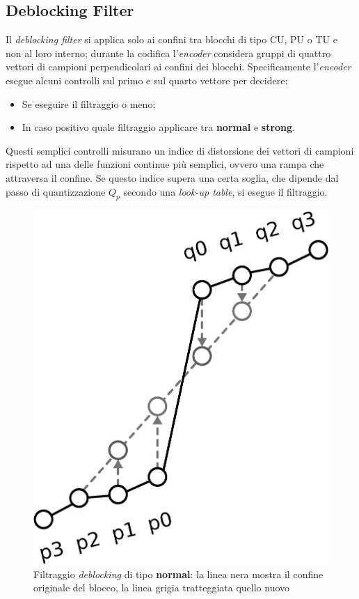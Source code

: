 \subsection{Deblocking Filter}
Il \emph{deblocking filter} si applica solo ai confini tra blocchi di tipo CU, 
PU o TU e non al loro interno; durante la codifica  l'\textit{encoder} 
considera gruppi di quattro vettori di campioni perpendicolari ai confini dei 
blocchi. 
Specificamente l'\textit{encoder} esegue alcuni controlli sul primo e sul 
quarto vettore per decidere:
\begin{itemize}
\item Se eseguire il filtraggio o meno;
\item In caso positivo quale filtraggio applicare tra \textbf{normal} e 
\textbf{strong}.
\end{itemize}
Questi semplici controlli misurano un indice di distorsione dei vettori di 
campioni rispetto ad una delle funzioni continue più semplici, ovvero una rampa 
che attraversa il confine. Se questo indice supera 
una certa soglia, che dipende dal passo di quantizzazione $Q_p$ secondo una 
\emph{look-up table}, si esegue il filtraggio.

\begin{figure}[H]
  \captionsetup{justification=raggedright}
  \centering
  \includegraphics[scale=0.3]{Figures/Deblocking_filter}
    \caption[Filtraggio \emph{deblocking} di tipo \textbf{normal}]
    {Filtraggio \emph{deblocking} di tipo \textbf{normal}: la linea nera mostra
      il confine originale del blocco, la linea grigia tratteggiata quello 
      nuovo}
\end{figure}

